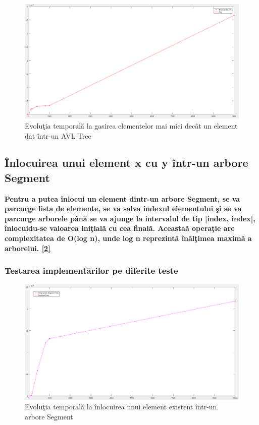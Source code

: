 \documentclass[12pt]{article}
\begin{document}
\begin{figure}[H]
\centering
\includegraphics[scale = 0.4]{MinAVL.png}
\caption{Evolu\c{t}ia temporal\u{a} la gasirea elementelor mai mici dec\^{a}t un element dat \^{i}ntr-un AVL Tree}
\end{figure}	

\subsection{\^{I}nlocuirea unui element x cu y \^{i}ntr-un arbore Segment}	
\textbf{\hspace{7mm} Pentru a putea \^{i}nlocui un element dintr-un arbore Segment, se va parcurge lista de elemente, se va salva indexul elementului \c{s}i se va parcurge arborele p\^{a}n\u{a} se va ajunge la intervalul de tip [index, index], \^{i}nlocuidu-se valoarea ini\c{t}ial\u{a} cu cea final\u{a}. Aceasta\u{a} opera\c{t}ie are complexitatea de O(log n), unde log n reprezint\u{a} \^{i}n\u{a}l\c{t}imea maxim\u{a} a arborelui. \hyperlink{page.14}{[2]}}

\subsubsection{Testarea implement\u{a}rilor pe diferite teste}

\begin{figure}[H]
\centering
\includegraphics[scale = 0.4]{ReplaceSeg.png}
\caption{Evolu\c{t}ia temporal\u{a} la \^{i}nlocuirea unui element existent \^{i}ntr-un arbore Segment}
\end{figure}
\end{document}
